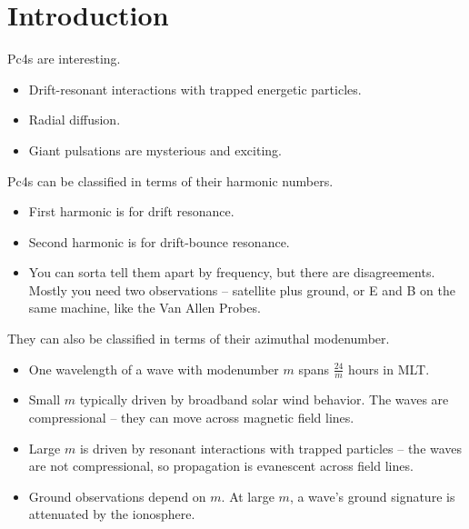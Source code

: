 \documentclass{article}
\newcommand{\azm}{\ensuremath{m}\xspace}
\begin{document}

\section{Introduction}

Pc4s are interesting. 

\begin{itemize}
    \item Drift-resonant interactions with trapped energetic particles. 
    \item Radial diffusion. 
    \item Giant pulsations are mysterious and exciting. 
\end{itemize}

Pc4s can be classified in terms of their harmonic numbers. 

\begin{itemize}
    \item First harmonic is for drift resonance. 
    \item Second harmonic is for drift-bounce resonance. 
    \item You can sorta tell them apart by frequency, but there are disagreements. Mostly you need two observations -- satellite plus ground, or E and B on the same machine, like the Van Allen Probes. 
\end{itemize}

They can also be classified in terms of their azimuthal modenumber. 

\begin{itemize}
    \item One wavelength of a wave with modenumber \azm spans $\frac{24}{\azm}$ hours in MLT. 
    \item Small \azm typically driven by broadband solar wind behavior. The waves are compressional -- they can move across magnetic field lines. 
    \item Large \azm is driven by resonant interactions with trapped particles -- the waves are not compressional, so propagation is evanescent across field lines. 
    \item Ground observations depend on \azm. At large \azm, a wave's ground signature is attenuated by the ionosphere. 
\end{itemize}
\end{document}
